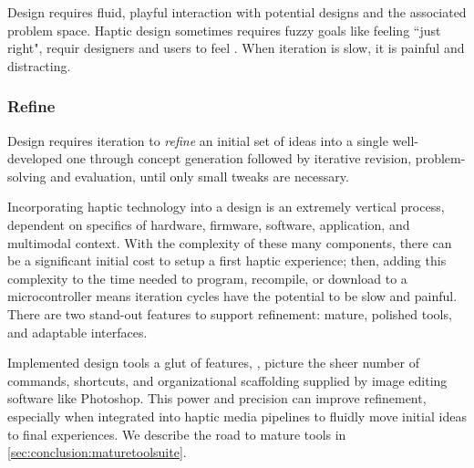 Design requires fluid, playful interaction with potential designs and the associated problem space.
Haptic design sometimes requires fuzzy goals like feeling ``just right", requir designers and users to feel .
When iteration is slow, it is painful and distracting.


%
%
\subsubsection{Refine}
Design requires iteration to \emph{refine} an initial set of ideas into a single well-developed one through concept generation followed by iterative revision, problem-solving and  evaluation, until only small tweaks are necessary.

Incorporating haptic technology into a design is an extremely vertical process,  dependent on  specifics of hardware, firmware, software, application, and multimodal context.
With the complexity of these many components, there can be a significant initial cost to setup a first haptic experience; then, adding this complexity to the time needed to program, recompile, or download to a microcontroller means iteration cycles have the potential to be slow and painful. 
There are two stand-out features to support refinement: mature, polished tools, and adaptable interfaces.
%

Implemented design tools a glut of features, \eg, picture the sheer number of commands, shortcuts, and organizational scaffolding supplied by image editing software like Photoshop.
This power and precision can improve refinement, especially when integrated into haptic media pipelines to fluidly move initial ideas to final experiences. 
We describe the road to mature tools in \autoref{sec:conclusion:maturetoolsuite}.


